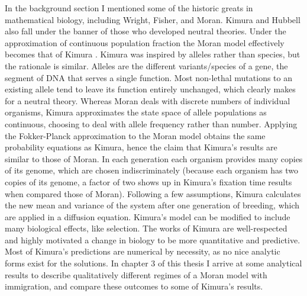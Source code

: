 In the background section I mentioned some of the historic greats in mathematical biology, including Wright, Fisher, and Moran. 
Kimura and Hubbell also fall under the banner of those who developed neutral theories. 
Under the approximation of continuous population fraction the Moran model effectively becomes that of Kimura \cite{Kimura1983}.
Kimura was inspired by alleles rather than species, but the rationale is similar. %
Alleles are the different variants/species of a gene, the segment of DNA that serves a single function. 
Most non-lethal mutations to an existing allele tend to leave its function entirely unchanged, which clearly makes for a neutral theory. 
Whereas Moran deals with discrete numbers of individual organisms, Kimura approximates the state space of allele populations as continuous, choosing to deal with allele frequency rather than number. 
Applying the Fokker-Planck approximation to the Moran model obtains the same probability equations as Kimura, hence the claim that Kimura's results are similar to those of Moran.
In each generation each organism provides many copies of its genome, which are chosen indiscriminately (because each organism has two copies of its genome, a factor of two shows up in Kimura's fixation time results when compared those of Moran). 
Following a few assumptions, Kimura calculates the new mean and variance of the system after one generation of breeding, which are applied in a diffusion equation. 
Kimura's model can be modified to include many biological effects, like selection. 
The works of Kimura are well-respected and highly motivated a change in biology to be more quantitative and predictive. %
Most of Kimura's predictions are numerical by necessity, as no nice analytic forms exist for the solutions.
In chapter 3 of this thesis I arrive at some analytical results to describe qualitatively different regimes of a Moran model with immigration, and compare these outcomes to some of Kimura's results. %

